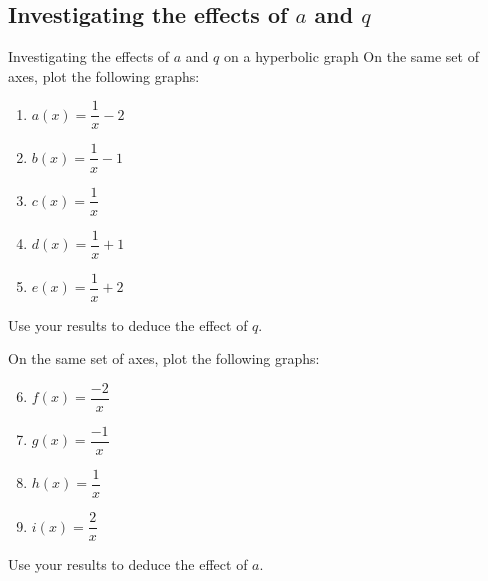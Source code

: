 % 

\subsection*{Investigating the effects of $a$ and $q$ }
\begin{Investigation}{Investigating the effects of $a$ and $q$ on a hyperbolic graph}
 On the same set of axes, plot the following graphs:
    \begin{enumerate}[itemsep=3pt, label=\textbf{\arabic*}. ] 
    \item $a(x)=\dfrac{1}{x}-2$
    \item $b(x)=\dfrac{1}{x}-1$
    \item $c(x)=\dfrac{1}{x}$
    \item $d(x)=\dfrac{1}{x}+1$
    \item $e(x)=\dfrac{1}{x}+2$
\end{enumerate}
Use your results to deduce the effect of $q$.\par

On the same set of axes, plot the following graphs:
    \begin{enumerate}[itemsep=3pt, label=\textbf{\arabic*}. ] 
\setcounter{enumi}{5}
    \item $f(x)=\dfrac{-2}{x}$
    \item $g(x)=\dfrac{-1}{x}$
    \item $h(x)=\dfrac{1}{x}$
    \item $i(x)=\dfrac{2}{x}$
    \end{enumerate}
Use your results to deduce the effect of $a$.
\end{Investigation}

